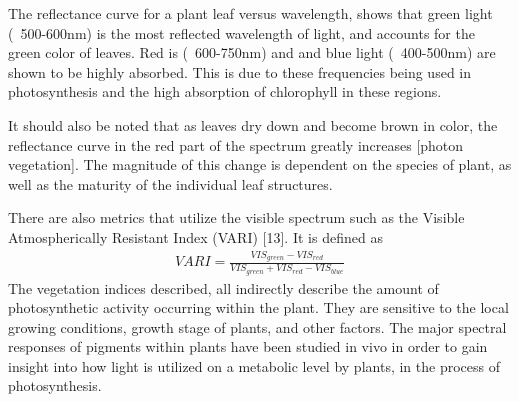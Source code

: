 
The reflectance curve for a plant leaf versus wavelength, shows that green light (~500-600nm) is the most reflected wavelength of light, and accounts for the green color of leaves. Red is (~600-750nm) and and blue light (~400-500nm) are shown to be highly absorbed.  This is due to these frequencies being used in photosynthesis and the high absorption of chlorophyll in these regions.

It should also be noted that as leaves dry down and become brown in color, the reflectance curve in the red part of the spectrum greatly increases [photon vegetation].  The magnitude of this change is dependent on the species of plant, as well as the maturity of the individual leaf structures.

There are also metrics that utilize the visible spectrum such as the Visible Atmospherically Resistant Index (VARI) [13].  It is defined as
%
\begin{align}
    VARI = \frac{VIS_{green} - VIS_{red}}{VIS_{green} + VIS_{red}-VIS_{blue}}
\end{align}
%
The vegetation indices described, all indirectly describe the amount of photosynthetic activity occurring within the plant.  They are sensitive to the local growing conditions, growth stage of plants, and other factors. The major spectral responses of pigments within plants have been studied in vivo in order to gain insight into how light is utilized on a metabolic level by plants, in the process of photosynthesis.
